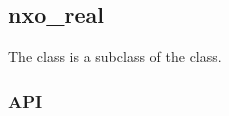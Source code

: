 %
%
%
%
%              

\subsection{nxo\_real}
\label{nxo_real}

The  class is a subclass of the  class.

\subsubsection{API}
